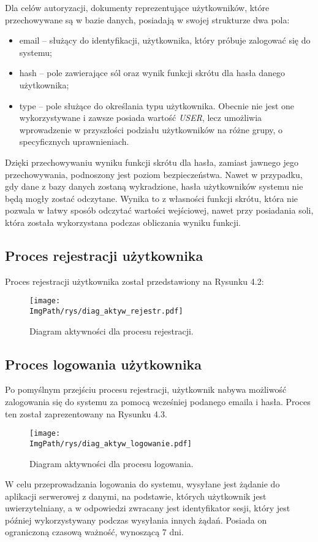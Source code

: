 \documentclass[a4paper,12pt,twoside,openany]{report}
\newcommand{\ImgPath}{.}
\begin{document}
Dla celów autoryzacji, dokumenty reprezentujące użytkowników, które przechowywane są w bazie danych, posiadają w swojej strukturze dwa pola:
\begin{itemize}
	\item email -- służący do identyfikacji, użytkownika, który próbuje zalogować się do systemu;
	
	\item hash -- pole zawierające sól oraz wynik funkcji skrótu dla hasła danego użytkownika;
	
	\item type -- pole służące do określania typu użytkownika. Obecnie nie jest one wykorzystywane i zawsze posiada wartość \textit{USER}, lecz umożliwia wprowadzenie w przyszłości podziału użytkowników na różne grupy, o specyficznych uprawnieniach.
	
\end{itemize}
Dzięki przechowywaniu wyniku funkcji skrótu dla hasła, zamiast jawnego jego przechowywania, podnoszony jest poziom bezpieczeństwa. Nawet w przypadku, gdy dane z bazy danych zostaną wykradzione, hasła użytkowników systemu nie będą mogły zostać odczytane. Wynika to z własności funkcji skrótu, która nie pozwala w łatwy sposób odczytać wartości wejściowej, nawet przy posiadania soli, która została wykorzystana podczas obliczania wyniku funkcji.


\subsection{Proces rejestracji użytkownika}
Proces rejestracji użytkownika został przedstawiony na Rysunku 4.2:
 \begin{figure}[!htbp]
	\begin{center}
		\centering
		\texttt{[image: \\ImgPath/rys/diag\_aktyw\_rejestr.pdf]}
	\end{center}
	\caption{Diagram aktywności dla procesu rejestracji.}
	\label{diagramAktywnosciRejstracja}
\end{figure}
\newpage

\subsection{Proces logowania użytkownika}
Po pomyślnym przejściu procesu rejestracji, użytkownik nabywa możliwość zalogowania się do systemu za pomocą wcześniej podanego emaila i hasła. Proces ten został zaprezentowany na Rysunku 4.3.


\begin{figure}[!htbp]
	\begin{center}
		\centering
		\texttt{[image: \\ImgPath/rys/diag\_aktyw\_logowanie.pdf]}
	\end{center}
	\caption{Diagram aktywności dla procesu logowania.}
	\label{diagramAktywnosciLogowanie}
\end{figure}
\newpage
W celu przeprowadzania logowania do systemu, wysyłane jest żądanie do aplikacji serwerowej z danymi, na podstawie, których użytkownik jest uwierzytelniany, a w odpowiedzi zwracany jest identyfikator sesji, który jest później wykorzystywany podczas wysyłania innych żądań. Posiada on ograniczoną czasową ważność, wynoszącą 7 dni.
\end{document}
